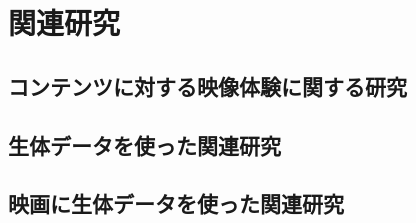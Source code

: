 \thispagestyle{myheadings}
\chapter{関連研究}


\section{コンテンツに対する映像体験に関する研究}

\section{生体データを使った関連研究}

\section{映画に生体データを使った関連研究}

